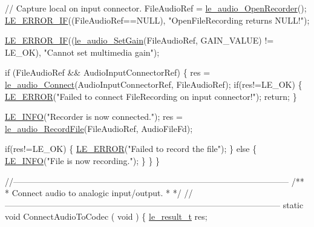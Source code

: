 \begin{DoxyCodeInclude}
{{{{{{{{{    \textcolor{comment}{// Capture local on input connector.}
    FileAudioRef = \hyperlink{le__audio__interface_8h_aeac35459c36748a4471b6d45f1ebeb24}{le\_audio\_OpenRecorder}();
    \hyperlink{le__log_8h_aceaf11a11691d6c676e36dd317b38dbd}{LE\_ERROR\_IF}((FileAudioRef==NULL), \textcolor{stringliteral}{"OpenFileRecording returns NULL!"});

    \hyperlink{le__log_8h_aceaf11a11691d6c676e36dd317b38dbd}{LE\_ERROR\_IF}((\hyperlink{le__audio__interface_8h_a65f11540e6af03a3494b6b9be76ba5fc}{le\_audio\_SetGain}(FileAudioRef, GAIN\_VALUE) != LE\_OK), \textcolor{stringliteral}{"Cannot
       set multimedia gain"});

    \textcolor{keywordflow}{if} (FileAudioRef && AudioInputConnectorRef)
    \{
        res = \hyperlink{le__audio__interface_8h_a338df65b2fb1ae0140d86880adbcf0de}{le\_audio\_Connect}(AudioInputConnectorRef, FileAudioRef);
        \textcolor{keywordflow}{if}(res!=LE\_OK)
        \{
            \hyperlink{le__log_8h_a353590f91b3143a7ba3a416ae5a50c3d}{LE\_ERROR}(\textcolor{stringliteral}{"Failed to connect FileRecording on input connector!"});
            \textcolor{keywordflow}{return};
        \}

        \hyperlink{le__log_8h_a23e6d206faa64f612045d688cdde5808}{LE\_INFO}(\textcolor{stringliteral}{"Recorder is now connected."});
        res = \hyperlink{le__audio__interface_8h_a393a26f6cff7fe05c1813fcafeef50f3}{le\_audio\_RecordFile}(FileAudioRef, AudioFileFd);

        \textcolor{keywordflow}{if}(res!=LE\_OK)
        \{
            \hyperlink{le__log_8h_a353590f91b3143a7ba3a416ae5a50c3d}{LE\_ERROR}(\textcolor{stringliteral}{"Failed to record the file"});
        \}
        \textcolor{keywordflow}{else}
        \{
            \hyperlink{le__log_8h_a23e6d206faa64f612045d688cdde5808}{LE\_INFO}(\textcolor{stringliteral}{"File is now recording."});
        \}
    \}
\}

\textcolor{comment}{//--------------------------------------------------------------------------------------------------}\textcolor{comment}{}
\textcolor{comment}{/**}
\textcolor{comment}{ * Connect audio to analogic input/output.}
\textcolor{comment}{ *}
\textcolor{comment}{ */}
\textcolor{comment}{//--------------------------------------------------------------------------------------------------}
\textcolor{keyword}{static} \textcolor{keywordtype}{void} ConnectAudioToCodec
(
    \textcolor{keywordtype}{void}
)
\{
    \hyperlink{le__basics_8h_a1cca095ed6ebab24b57a636382a6c86c}{le\_result\_t} res;

}}}}}}}}}
\end{DoxyCodeInclude}

